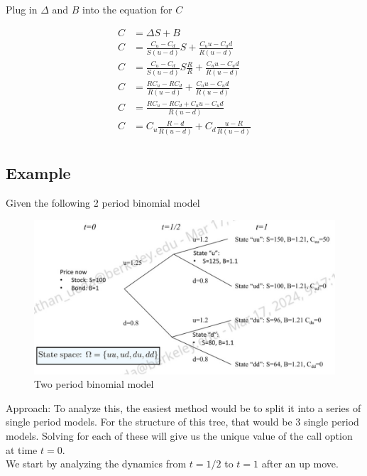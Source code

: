\documentclass[11pt]{article}
\begin{document}
Plug in $\Delta$ and $B$ into the equation for $C$

\begin{align*}
    C &= \Delta S + B \\
    C &= \frac{C_u - C_d}{S (u-d)} S + \frac{C_u u- C_u d}{R(u-d)} \\
    C &= \frac{C_u - C_d}{S (u-d)} S \frac{R}{R} + \frac{C_u u- C_u d}{R(u-d)} \\
    C &= \frac{RC_u - RC_d}{R(u-d)} + \frac{C_u u- C_u d}{R(u-d)} \\
    C &= \frac{RC_u - RC_d + C_u u - C_u d}{R(u-d)} \\
    C &= C_u \frac{R-d}{R(u-d)} + C_d\frac{u-R}{R(u-d)} \\
\end{align*}

\subsection{Example}
Given the following 2 period binomial model 

\begin{figure}[H] 
    \centering 
    \includegraphics[width=5in]{imgs/two_period_two_state_bin_tree_model.png}
    \caption{Two period binomial model}
\end{figure}

Approach: To analyze this, the easiest method would be to split it into a series of single 
period models. For the structure of this tree, that would be 3 single period models. Solving 
for each of these will give us the unique value of the call option at time $t=0$. \\

We start by analyzing the dynamics from $t=1/2$ to $t=1$ after an up move. 
\end{document}
